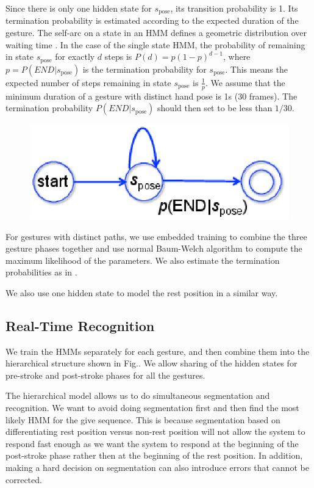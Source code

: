 \documentclass[conference]{IEEEtran}
\begin{document}
Since there is only one hidden state for $s_{\text{pose}}$, its transition
probability is 1. Its termination probability is estimated according to the
expected duration of the gesture. The self-arc on a state in an HMM defines a 
geometric distribution over waiting time \cite{murphy02}. In the case of the
single state HMM, the probability of remaining in state $s_{\text{pose}}$ for
exactly $d$ steps is $P(d) = p(1-p)^{d - 1}$, where $p = P(END|s_\text{pose})$
is the termination probability for $s_{\text{pose}}$. This means the expected
number of steps remaining in state $s_{\text{pose}}$ is $\frac{1}{p}$. We assume
that the minimum duration of a gesture with distinct hand pose is 1s (30
frames). The termination probability $P(END|s_\text{pose})$ should then set to
be less than $1/30$.

\begin{figure}[t]
\centering
\includegraphics[width=\columnwidth]{fig/single_state.ps}
\end{figure}

For gestures with distinct paths, we use embedded training to combine the three
gesture phases together and use normal Baum-Welch algorithm to compute the
maximum likelihood of the parameters. We also estimate the termination
probabilities as in \cite{yin13}.

We also use one hidden state to model the rest position in a similar way.

\subsection{Real-Time Recognition}
We train the HMMs separately for each gesture, and then combine them into the
hierarchical structure shown in Fig.. We allow sharing of the hidden states for
pre-stroke and post-stroke phases for all the gestures.

The hierarchical model allows us to do simultaneous segmentation and
recognition. We want to avoid doing segmentation first and then find the most
likely HMM for the give sequence. This is because segmentation based on
differentiating rest position versus non-rest position will not allow the system
to respond fast enough as we want the system to respond at the beginning of the
post-stroke phase rather then at the beginning of the rest position. In
addition, making a hard decision on segmentation can also introduce errors that
cannot be corrected. 
\end{document}
